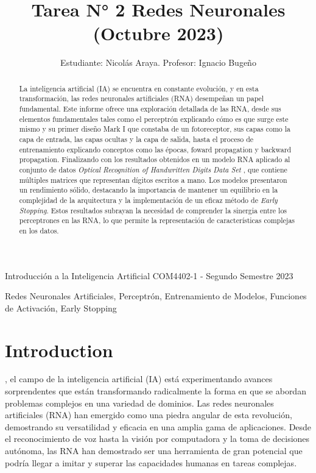 \documentclass[journal]{IEEEtai}
\begin{document}
\title{Tarea N° 2 {\sc Redes Neuronales} (Octubre 2023)} 


\author{Estudiante: Nicolás Araya. Profesor: Ignacio Bugeño}

{Introducción a la Inteligencia Artificial COM4402-1 - Segundo Semestre 2023}

\maketitle

\begin{abstract}
La inteligencia artificial (IA) se encuentra en constante evolución, y en esta transformación, las redes neuronales artificiales (RNA) desempeñan un papel fundamental. Este informe ofrece una exploración detallada de las RNA, desde sus elementos fundamentales tales como el perceptrón explicando cómo es que surge este mismo y su primer diseño Mark I \cite{Rosenblatt} que constaba de un fotoreceptor, sus capas como la capa de entrada, las capas ocultas y la capa de salida, hasta el proceso de entrenamiento explicando conceptos como las épocas, foward propagation y backward propagation. Finalizando con los resultados obtenidos en un modelo RNA aplicado al conjunto de datos \textit{Optical Recognition of Handwritten Digits Data Set} \cite{dataset}, que contiene múltiples matrices que representan dígitos escritos a mano.
Los modelos presentaron un rendimiento sólido, destacando la importancia de mantener un equilibrio en la complejidad de la arquitectura y la implementación de un eficaz método de \textit{Early Stopping}. Estos resultados subrayan la necesidad de comprender la sinergia entre los perceptrones en las RNA, lo que permite la representación de características complejas en los datos.
\end{abstract}

\begin{IEEEkeywords}
Redes Neuronales Artificiales, Perceptrón, Entrenamiento de Modelos, Funciones de Activación, Early Stopping
\end{IEEEkeywords}

\section{Introduction}

, el campo de la inteligencia artificial (IA) está experimentando avances sorprendentes que están transformando radicalmente la forma en que se abordan problemas complejos en una variedad de dominios. Las redes neuronales artificiales (RNA) han emergido como una piedra angular de esta revolución, demostrando su versatilidad y eficacia en una amplia gama de aplicaciones. Desde el reconocimiento de voz hasta la visión por computadora y la toma de decisiones autónoma, las RNA han demostrado ser una herramienta de gran potencial que podría llegar a imitar y superar las capacidades humanas en tareas complejas.
\end{document}

